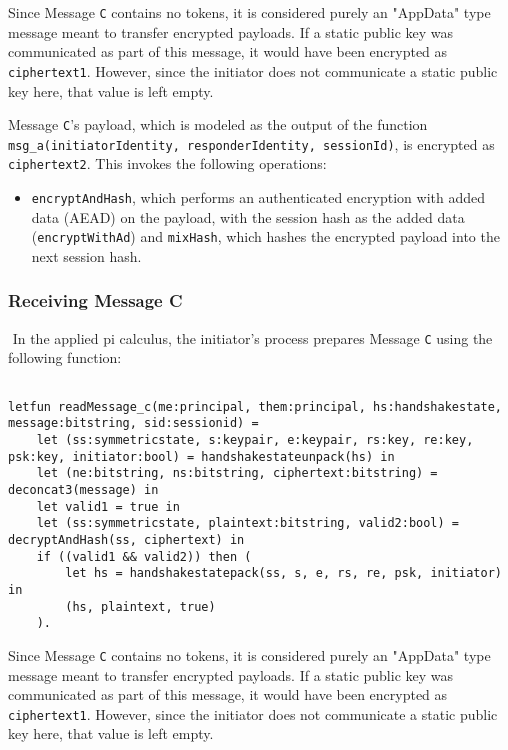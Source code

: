 Since Message \texttt{C} contains no tokens, it is considered purely an "AppData" type message meant to transfer encrypted payloads.
If a static public key was communicated as part of this message, it would have been encrypted as \texttt{ciphertext1}. However, since the initiator does not communicate a static public key here, that value is left empty.


Message \texttt{C}'s payload, which is modeled as the output of the function \texttt{msg\_a(initiatorIdentity, responderIdentity, sessionId)}, is encrypted as \texttt{ciphertext2}. This invokes the following operations:


\begin{itemize}

\item \texttt{encryptAndHash}, which performs an authenticated encryption with added data (AEAD) on the payload, with the session hash as the added data (\texttt{encryptWithAd}) and \texttt{mixHash}, which hashes the encrypted payload into the next session hash.

\end{itemize}
\subsubsection{Receiving Message C}$ $
In the applied pi calculus, the initiator's process prepares Message \texttt{C} using the following function:


\begin{lstlisting}

letfun readMessage_c(me:principal, them:principal, hs:handshakestate, message:bitstring, sid:sessionid) =
	let (ss:symmetricstate, s:keypair, e:keypair, rs:key, re:key, psk:key, initiator:bool) = handshakestateunpack(hs) in
	let (ne:bitstring, ns:bitstring, ciphertext:bitstring) = deconcat3(message) in
	let valid1 = true in
	let (ss:symmetricstate, plaintext:bitstring, valid2:bool) = decryptAndHash(ss, ciphertext) in
	if ((valid1 && valid2)) then (
		let hs = handshakestatepack(ss, s, e, rs, re, psk, initiator) in
		(hs, plaintext, true)
	).

\end{lstlisting}

Since Message \texttt{C} contains no tokens, it is considered purely an "AppData" type message meant to transfer encrypted payloads.
If a static public key was communicated as part of this message, it would have been encrypted as \texttt{ciphertext1}. However, since the initiator does not communicate a static public key here, that value is left empty.



